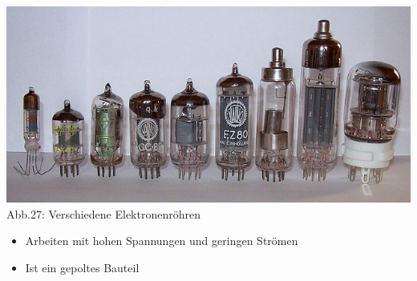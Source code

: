 \begin{frame}
	\begin{center}
		\includegraphics[scale=0.35]{a06/Roehren.jpg}\\
		Abb.27: Verschiedene Elektronenröhren \cite{wmde}
	\end{center}
	\begin{itemize}
		\item	Arbeiten mit hohen Spannungen und geringen Strömen
		\item	Ist ein gepoltes Bauteil
	\end{itemize}
\end{frame}

